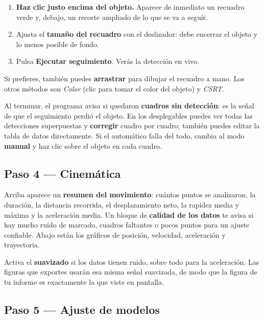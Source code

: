 \documentclass[11pt,a4paper]{article}
\begin{document}
\begin{receta}
  \begin{enumerate}
    \item \textbf{Haz clic justo encima del objeto.} Aparece de inmediato un
      recuadro verde y, debajo, un recorte ampliado de lo que se va a seguir.
    \item Ajusta el \textbf{tamaño del recuadro} con el deslizador: debe encerrar
      el objeto y lo menos posible de fondo.
    \item Pulsa \textbf{Ejecutar seguimiento}. Verás la detección en vivo.
  \end{enumerate}
  Si prefieres, también puedes \textbf{arrastrar} para dibujar el recuadro a mano.
  Los otros métodos son \emph{Color} (clic para tomar el color del objeto) y
  \emph{CSRT}.
\end{receta}

\begin{ojo}
  Al terminar, el programa avisa si quedaron \textbf{cuadros sin detección}: es la
  señal de que el seguimiento perdió el objeto. En los desplegables puedes ver
  todas las detecciones superpuestas y \textbf{corregir} cuadro por cuadro; también
  puedes editar la tabla de datos directamente. Si el automático falla del todo,
  cambia al modo \textbf{manual} y haz clic sobre el objeto en cada cuadro.
\end{ojo}

\subsection{Paso 4 — Cinemática}

Arriba aparece un \textbf{resumen del movimiento}: cuántos puntos se analizaron,
la duración, la distancia recorrida, el desplazamiento neto, la rapidez media y
máxima y la aceleración media. Un bloque de \textbf{calidad de los datos} te avisa
si hay mucho ruido de marcado, cuadros faltantes o pocos puntos para un ajuste
confiable. Abajo están los gráficos de posición, velocidad, aceleración y
trayectoria.

\begin{obs}
  Activa el \textbf{suavizado} si los datos tienen ruido, sobre todo para la
  aceleración. Las figuras que exportes usarán esa misma señal suavizada, de modo
  que la figura de tu informe es exactamente la que viste en pantalla.
\end{obs}

\subsection{Paso 5 — Ajuste de modelos}
\end{document}
